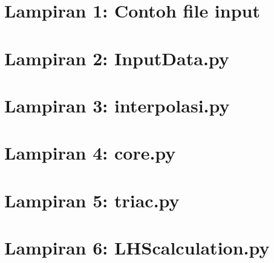 \chapter*{Lampiran 1: Contoh file input}
\label{lamp:inputExample}

%

\begin{landscape}
\chapter*{Lampiran 2: InputData.py}
\scriptsize

\normalsize

\chapter*{Lampiran 3: interpolasi.py}
\scriptsize

\normalsize

\chapter*{Lampiran 4: core.py}
\scriptsize

\normalsize

\chapter*{Lampiran 5: triac.py}
\scriptsize

\normalsize

\chapter*{Lampiran 6: LHScalculation.py}
\scriptsize

\normalsize


\end{landscape}
